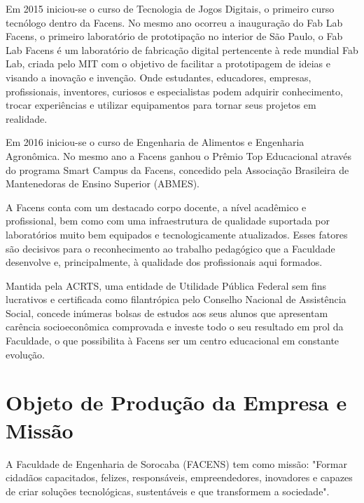 \documentclass[
	12pt,				%
	oneside,			%
	a4paper,			%
	chapter=TITLE,		%
	section=TITLE,		%
	sumario=tradicional %
	english,			%
	french,				%
	spanish,			%
	brazil				%
	]{abntex2}
\begin{document}
Em 2015 iniciou-se o curso de Tecnologia de Jogos Digitais, o primeiro curso tecnólogo dentro da Facens. No mesmo ano ocorreu a inauguração do Fab Lab Facens, o primeiro laboratório de prototipação no interior de São Paulo, o Fab Lab Facens é um laboratório de fabricação digital pertencente à rede mundial Fab Lab, criada pelo MIT com o objetivo de facilitar a prototipagem de ideias e visando a inovação e invenção. Onde estudantes, educadores, empresas, profissionais, inventores, curiosos e especialistas podem adquirir conhecimento, trocar experiências e utilizar equipamentos para tornar seus projetos em realidade.

Em 2016 iniciou-se o curso de Engenharia de Alimentos e Engenharia Agronômica. No mesmo ano a Facens ganhou o Prêmio Top Educacional através do programa Smart Campus da Facens, concedido pela Associação Brasileira de Mantenedoras de Ensino Superior (ABMES).

A Facens conta com um destacado corpo docente, a nível acadêmico e profissional, bem como com uma infraestrutura de qualidade suportada por laboratórios muito bem equipados e tecnologicamente atualizados. Esses fatores são decisivos para o reconhecimento ao trabalho pedagógico que a Faculdade desenvolve e, principalmente, à qualidade dos profissionais aqui formados.

Mantida pela ACRTS, uma entidade de Utilidade Pública Federal sem fins lucrativos e certificada como filantrópica pelo Conselho Nacional de Assistência Social, concede inúmeras bolsas de estudos aos seus alunos que apresentam carência socioeconômica comprovada e investe todo o seu resultado em prol da Faculdade, o que possibilita à Facens ser um centro educacional em constante evolução.

\section{Objeto de Produção da Empresa e Missão}
\label{sec:prodmissaoempresa}
A Faculdade de Engenharia de Sorocaba (FACENS) tem como missão: "Formar cidadãos capacitados, felizes, responsáveis, empreendedores, inovadores e capazes de criar soluções tecnológicas, sustentáveis e que transformem a sociedade".
\end{document}

